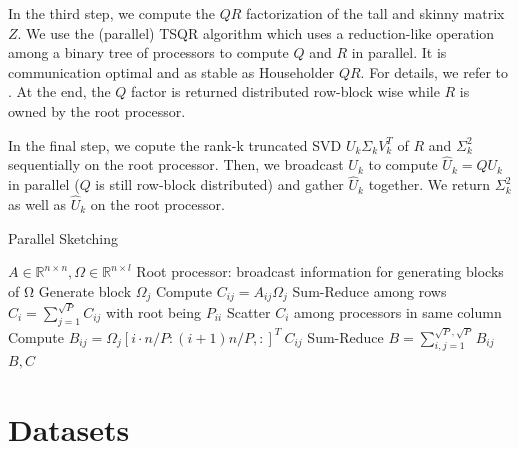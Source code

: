 \documentclass{article}
\theoremstyle{definition}
\begin{document}
In the third step, we compute the $QR$ factorization of the tall and skinny matrix $Z$. We use the (parallel) TSQR algorithm which uses a reduction-like operation among a binary tree of processors to compute $Q$ and $R$ in parallel. It is communication optimal and as stable as Householder $QR$. For details, we refer to \cite{demmel2008}. At the end, the $Q$ factor is returned distributed row-block wise while $R$ is owned by the root processor.

In the final step, we copute the rank-k truncated SVD $U_k \Sigma_k V_k^T$ of $R$ and $\Sigma_k^2$ sequentially on the root processor. Then, we broadcast $U_k$ to compute $\hat{U}_k = Q U_k$ in parallel ($Q$ is still row-block distributed) and gather $\hat{U}_k$ together. We return $\Sigma_k^2$ as well as $\hat{U}_k$ on the root processor.

\begin{algorithm}[t]
    \caption{Parallel Sketching} \label{algo:sketching}
    \begin{algorithmic}[1]
        \Require $A \in \mathbb{R}^{n \times n}, \Omega \in \mathbb{R}^{n \times l}$
        \State Root processor: broadcast information for generating blocks of Ω
            \State Generate block $\Omega_j$
            \State Compute $C_{ij} = A_{ij} \Omega_j$
            \State Sum-Reduce among rows $C_i = \sum_{j = 1}^{\sqrt{P}} C_{ij}$ with root being $P_{ii}$
            \State Scatter $C_i$ among processors in same column
            \State Compute $B_{ij} = \Omega_j[i \cdot n/P : (i+1) n/P, :]^T \ C_{ij}$
        \EndFor
        \State Sum-Reduce $B = \sum_{i,j = 1}^{\sqrt{P}, \sqrt{P}} B_{ij}$
        \Ensure $B, C$
    \end{algorithmic}
\end{algorithm}

\section{Datasets}\label{sec:datasets}
\end{document}
